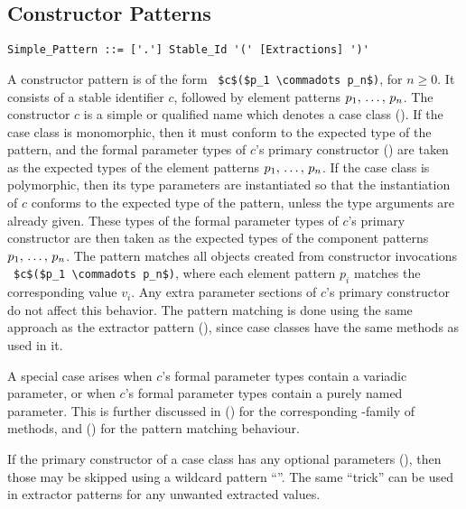\subsection{Constructor Patterns}
\label{sec:constructor-patterns}

\syntax\begin{lstlisting}
Simple_Pattern ::= ['.'] Stable_Id '(' [Extractions] ')'
\end{lstlisting}

A constructor pattern is of the form ~\lstinline!$c$($p_1 \commadots p_n$)!, for $n \geq 0$. It consists of a stable identifier $c$, followed by element patterns $p_1 ,\, \ldots ,\, p_n$. The constructor $c$ is a simple or qualified name which denotes a case class (). If the case class is monomorphic, then it must conform to the expected type of the pattern, and the formal parameter types of $c$'s primary constructor () are taken as the expected types of the element patterns $p_1 ,\, \ldots ,\, p_n$. If the case class is polymorphic, then its type parameters are instantiated so that the instantiation of $c$ conforms to the expected type of the pattern, unless the type arguments are already given. These types of the formal parameter types of $c$'s primary constructor are then taken as the expected types of the component patterns $p_1 ,\, \ldots ,\, p_n$. The pattern matches all objects created from constructor invocations ~\lstinline!$c$($p_1 \commadots p_n$)!, where each element pattern $p_i$ matches the corresponding value $v_i$. Any extra parameter sections of $c$'s primary constructor do not affect this behavior. The pattern matching is done using the same approach as the extractor pattern (), since case classes have the same  methods as used in it. 

A special case arises when $c$'s formal parameter types contain a variadic parameter, or when $c$'s formal parameter types contain a purely named parameter. This is further discussed in () for the corresponding -family of methods, and () for the pattern matching behaviour. 

If the primary constructor of a case class has any optional parameters (), then those may be skipped using a wildcard pattern ``\code{_}''. The same ``trick'' can be used in extractor patterns for any unwanted extracted values. 






